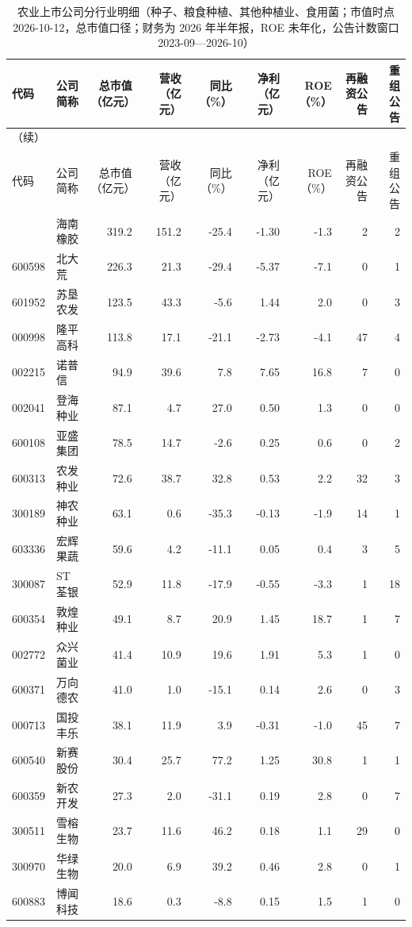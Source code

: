 \begingroup\scriptsize\setlength{\tabcolsep}{2pt}
\begin{longtable}{@{}llrrrrrrr@{}}
\caption{农业上市公司分行业明细（种子、粮食种植、其他种植业、食用菌；市值时点 2026-10-12，总市值口径；财务为 2026 年半年报，ROE 未年化，公告计数窗口 2023-09---2026-10）}\label{tab:comp-planting}\\
\toprule
代码 & 公司简称 & 总市值（亿元） & 营收（亿元） & 同比（\%） & 净利（亿元） & ROE（\%） & 再融资公告 & 重组公告 \\
\midrule
\endfirsthead
\multicolumn{9}{l}{\small（续）}\\
\toprule
代码 & 公司简称 & 总市值（亿元） & 营收（亿元） & 同比（\%） & 净利（亿元） & ROE（\%） & 再融资公告 & 重组公告 \\
\midrule
\endhead
\bottomrule
\endlastfoot
601118 & 海南橡胶 & 319.2 & 151.2 & -25.4 & -1.30 & -1.3 & 2 & 2 \\
600598 & 北大荒 & 226.3 & 21.3 & -29.4 & -5.37 & -7.1 & 0 & 1 \\
601952 & 苏垦农发 & 123.5 & 43.3 & -5.6 & 1.44 & 2.0 & 0 & 3 \\
000998 & 隆平高科 & 113.8 & 17.1 & -21.1 & -2.73 & -4.1 & 47 & 4 \\
002215 & 诺普信 & 94.9 & 39.6 & 7.8 & 7.65 & 16.8 & 7 & 0 \\
002041 & 登海种业 & 87.1 & 4.7 & 27.0 & 0.50 & 1.3 & 0 & 0 \\
600108 & 亚盛集团 & 78.5 & 14.7 & -2.6 & 0.25 & 0.6 & 0 & 2 \\
600313 & 农发种业 & 72.6 & 38.7 & 32.8 & 0.53 & 2.2 & 32 & 3 \\
300189 & 神农种业 & 63.1 & 0.6 & -35.3 & -0.13 & -1.9 & 14 & 1 \\
603336 & 宏辉果蔬 & 59.6 & 4.2 & -11.1 & 0.05 & 0.4 & 3 & 5 \\
300087 & ST荃银 & 52.9 & 11.8 & -17.9 & -0.55 & -3.3 & 1 & 18 \\
600354 & 敦煌种业 & 49.1 & 8.7 & 20.9 & 1.45 & 18.7 & 1 & 7 \\
002772 & 众兴菌业 & 41.4 & 10.9 & 19.6 & 1.91 & 5.3 & 1 & 0 \\
600371 & 万向德农 & 41.0 & 1.0 & -15.1 & 0.14 & 2.6 & 0 & 3 \\
000713 & 国投丰乐 & 38.1 & 11.9 & 3.9 & -0.31 & -1.0 & 45 & 7 \\
600540 & 新赛股份 & 30.4 & 25.7 & 77.2 & 1.25 & 30.8 & 1 & 1 \\
600359 & 新农开发 & 27.3 & 2.0 & -31.1 & 0.19 & 2.8 & 0 & 7 \\
300511 & 雪榕生物 & 23.7 & 11.6 & 46.2 & 0.18 & 1.1 & 29 & 0 \\
300970 & 华绿生物 & 20.0 & 6.9 & 39.2 & 0.46 & 2.8 & 0 & 1 \\
600883 & 博闻科技 & 18.6 & 0.3 & -8.8 & 0.15 & 1.5 & 1 & 0 \\
\end{longtable}
\endgroup
